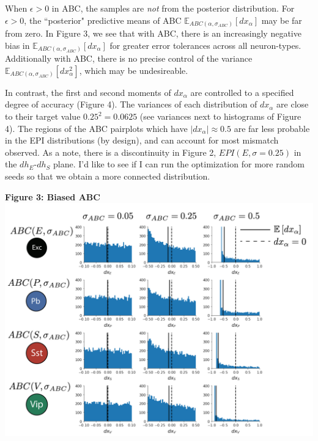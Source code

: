 \documentclass[11pt]{article}
\begin{document}
When $\epsilon > 0$ in ABC, the samples are \textit{not} from the posterior distribution.
For $\epsilon > 0$, the ``posterior" predictive means of ABC $\mathbb{E}_{ABC(\alpha, \sigma_{ABC})}\left[dx_\alpha \right]$ may be far from zero.
In Figure 3, we see that with ABC, there is an increasingly negative bias in $\mathbb{E}_{ABC(\alpha, \sigma_{ABC})}\left[dx_\alpha \right]$ for greater error tolerances across all neuron-types.  
Additionally with ABC, there is no precise control of the variance $\mathbb{E}_{ABC(\alpha, \sigma_{ABC})}\left[dx_\alpha^2 \right]$, which may be undesireable.

In contrast, the first and second moments of $dx_\alpha$ are controlled to a specified degree of accuracy (Figure 4).
The variances of each distribution of $dx_\alpha$ are close to their target value $0.25^2 = 0.0625$ (see variances next to histograms of Figure 4). 
The regions of the ABC pairplots which have $|dx_\alpha| \approx 0.5$ are far less probable in the EPI distributions (by design), and can account for most mismatch observed.
As a note, there is a discontinuity in Figure 2, $EPI(E, \sigma=0.25)$ in the $dh_E$-$dh_S$ plane.
I'd like to see if I can run the optimization for more random seeds so that we obtain a more connected distribution.

\begin{center}
\textbf{Figure 3: Biased ABC} \\
\includegraphics[scale=0.4]{figs/V1_ABC_Tx.pdf}
\end{center}

\clearpage
\end{document}
